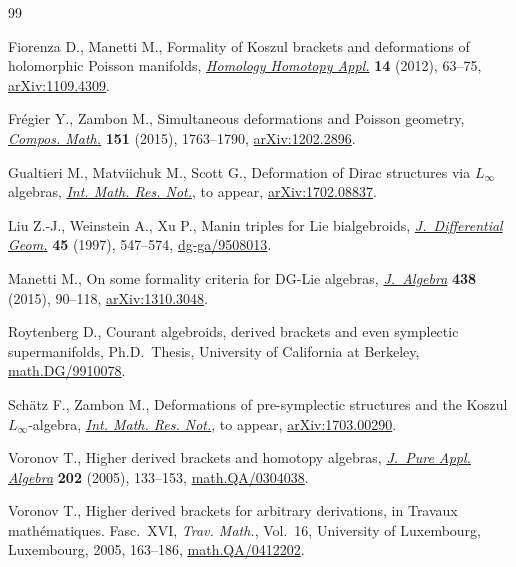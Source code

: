\begin{thebibliography}{99}
\footnotesize\itemsep=0pt

Fiorenza D., Manetti M., Formality of {K}oszul brackets and deformations of
 holomorphic {P}oisson manifolds, \href{https://doi.org/10.4310/HHA.2012.v14.n2.a4}{\textit{Homology Homotopy Appl.}} \textbf{14}
 (2012), 63--75, \href{https://arxiv.org/abs/1109.4309}{arXiv:1109.4309}.

Fr\'{e}gier Y., Zambon M., Simultaneous deformations and {P}oisson geometry,
 \href{https://doi.org/10.1112/S0010437X15007277}{\textit{Compos. Math.}} \textbf{151} (2015), 1763--1790, \href{https://arxiv.org/abs/1202.2896}{arXiv:1202.2896}.

Gualtieri M., Matviichuk M., Scott G., Deformation of {D}irac structures via
 {$L_{\infty}$} algebras, \href{https://doi.org/10.1093/imrn/rny134}{\textit{Int. Math. Res. Not.}}, {t}o appear,
 \href{https://arxiv.org/abs/1702.08837}{arXiv:1702.08837}.

Liu Z.-J., Weinstein A., Xu P., Manin triples for {L}ie bialgebroids,
 \href{https://doi.org/10.4310/jdg/1214459842}{\textit{J.~Differential Geom.}} \textbf{45} (1997), 547--574,
 \href{https://arxiv.org/abs/dg-ga/9508013}{dg-ga/9508013}.

Manetti M., On some formality criteria for {DG}-{L}ie algebras,
 \href{https://doi.org/10.1016/j.jalgebra.2015.04.029}{\textit{J.~Algebra}} \textbf{438} (2015), 90--118, \href{https://arxiv.org/abs/1310.3048}{arXiv:1310.3048}.

Roytenberg D., Courant algebroids, derived brackets and even symplectic
 supermanifolds, Ph.D.~Thesis, University of California at Berkeley,
 \href{https://arxiv.org/abs/math.DG/9910078}{math.DG/9910078}.

Sch\"atz F., Zambon M., Deformations of pre-symplectic structures and the
 {K}oszul {$L_{\infty}$}-algebra, \href{https://doi.org/10.1093/imrn/rny123}{\textit{Int. Math. Res. Not.}}, {t}o appear,
 \href{https://arxiv.org/abs/1703.00290}{arXiv:1703.00290}.

Voronov T., Higher derived brackets and homotopy algebras, \href{https://doi.org/10.1016/j.jpaa.2005.01.010}{\textit{J.~Pure
 Appl. Algebra}} \textbf{202} (2005), 133--153, \href{https://arxiv.org/abs/math.QA/0304038}{math.QA/0304038}.

Voronov T., Higher derived brackets for arbitrary derivations, in Travaux
 math\'{e}matiques. {F}asc.~{XVI}, \textit{Trav. Math.}, Vol.~16, University
 of Luxembourg, Luxembourg, 2005, 163--186, \href{https://arxiv.org/abs/math.QA/0412202}{math.QA/0412202}.

\end{thebibliography}
